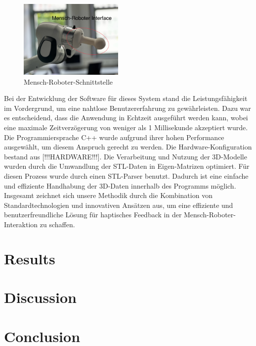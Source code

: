 \documentclass[conference]{IEEEtran}
\begin{document}
\begin{figure}
    \centering
    \includegraphics[width=0.45\textwidth]{pics/interface.jpeg}
    \caption{Mensch-Roboter-Schnittstelle}
    \label{fig:MRinterface}
\end{figure}

Bei der Entwicklung der Software für dieses System stand die Leistungsfähigkeit 
im Vordergrund, um eine nahtlose Benutzererfahrung zu gewährleisten. Dazu war es 
entscheidend, dass die Anwendung in Echtzeit ausgeführt werden kann, wobei eine maximale 
Zeitverzögerung von weniger als 1 Millisekunde akzeptiert wurde. Die Programmiersprache 
C++ wurde aufgrund ihrer hohen Performance ausgewählt, um diesem Anspruch gerecht zu werden. 
Die Hardware-Konfiguration bestand aus [!!!HARDWARE!!!].
Die Verarbeitung und Nutzung der 3D-Modelle wurden durch die Umwandlung der STL-Daten in 
Eigen-Matrizen optimiert. Für diesen Prozess wurde durch einen STL-Parser benutzt. Dadurch ist 
eine einfache und effiziente Handhabung der 3D-Daten innerhalb des Programms möglich.
Insgesamt zeichnet sich unsere Methodik durch die Kombination von Standardtechnologien 
und innovativen Ansätzen aus, um eine effiziente und benutzerfreundliche Lösung für haptisches 
Feedback in der Mensch-Roboter-Interaktion zu schaffen.

\section{Results}

\section{Discussion}

\section{Conclusion}

\printbibliography
\end{document}
